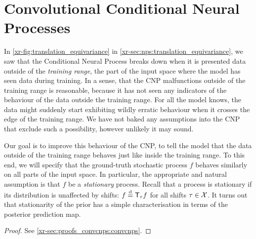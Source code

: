 \documentclass[12pt]{report}
\newcommand{\xrprefix}[1]{xr-#1}
\begin{document}
\section{Convolutional Conditional Neural Processes}
\label{sec:convcnps:convcnps}

In \cref{\xrprefix{fig:translation_equivariance}} in \cref{\xrprefix{sec:nps:translation_equivariance}},
we saw that the Conditional Neural Process breaks down when it is presented data outside of the \emph{training range}, the part of the input space where the model has seen data during training.
In a sense, that the CNP malfunctions outside of the training range is reasonable,
because it has not seen any indicators of the behaviour of the data outside the training range.
For all the model knows, the data might suddenly start exhibiting wildly erratic behaviour when it crosses the edge of the training range.
We have not baked any assumptions into the CNP that exclude such a possibility, however unlikely it may sound.

Our goal is to improve this behaviour of the CNP, to tell the model that the data outside of the training range behaves just like inside the training range.
To this end, we will specify that the ground-truth stochastic process $f$ behaves similarly on all parts of the input space.
In particular, the appropriate and natural assumption is that $f$ be a \emph{stationary} process.
Recall that a process is stationary if its distribution is unaffected by shifts: $f \disteq \T_\tau f$ for all shifts $\tau \in \mathcal{X}$.
It turns out that stationarity of the prior has a simple characterisation in terms of the posterior prediction map.

\begin{proof}
    See \cref{\xrprefix{sec:proofs_convcnps:convcnps}}.
\end{proof}
\end{document}
